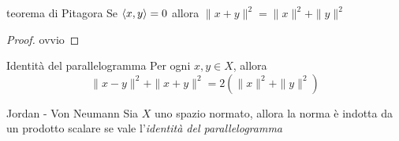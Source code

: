\begin{proposition}{teorema di Pitagora}
    Se \({\left\langle x,y\right\rangle} =0\) allora \(\|x+y\|^2 = \|x\|^2 + \|y\|^2\) 
\end{proposition}
\begin{proof}{}
    ovvio
\end{proof}
\begin{proposition}{Identità del parallelogramma}
    Per ogni \(x,y \in X\), allora
    \[
      \|x-y\|^2 + \|x+y\|^2 = 2{\left( \|x\|^2 + \|y\|^2 \right)} 
    \]
\end{proposition}

\begin{theorem}{Jordan - Von Neumann}
    Sia \(X\) uno spazio normato, allora la norma è indotta da un prodotto
    scalare se vale l'\emph{identità del parallelogramma}
\end{theorem}
